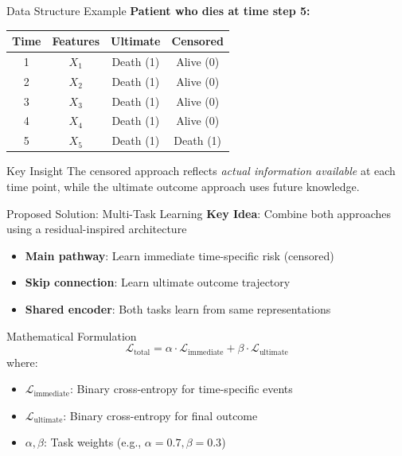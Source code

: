 \documentclass{beamer}
\begin{document}
\begin{frame}{Data Structure Example}
\textbf{Patient who dies at time step 5:}

\begin{table}[h]
\centering
\small
\begin{tabular}{|c|c|c|c|}
\hline
\textbf{Time} & \textbf{Features} & \textbf{Ultimate} & \textbf{Censored} \\
\hline
1 & $X_1$ & Death (1) & Alive (0) \\
2 & $X_2$ & Death (1) & Alive (0) \\
3 & $X_3$ & Death (1) & Alive (0) \\
4 & $X_4$ & Death (1) & Alive (0) \\
5 & $X_5$ & Death (1) & Death (1) \\
\hline
\end{tabular}
\end{table}

\vspace{0.3cm}
\begin{alertblock}{Key Insight}
The censored approach reflects \emph{actual information available} at each time point, while the ultimate outcome approach uses future knowledge.
\end{alertblock}
\end{frame}

\begin{frame}{Proposed Solution: Multi-Task Learning}
\textbf{Key Idea}: Combine both approaches using a residual-inspired architecture

\vspace{0.3cm}
\begin{itemize}
    \item \textbf{Main pathway}: Learn immediate time-specific risk (censored)
    \item \textbf{Skip connection}: Learn ultimate outcome trajectory
    \item \textbf{Shared encoder}: Both tasks learn from same representations
\end{itemize}

\vspace{0.3cm}
\begin{block}{Mathematical Formulation}
\begin{equation*}
\mathcal{L}_{\text{total}} = \alpha \cdot \mathcal{L}_{\text{immediate}} + \beta \cdot \mathcal{L}_{\text{ultimate}}
\end{equation*}
where:
\begin{itemize}
    \item $\mathcal{L}_{\text{immediate}}$: Binary cross-entropy for time-specific events
    \item $\mathcal{L}_{\text{ultimate}}$: Binary cross-entropy for final outcome
    \item $\alpha, \beta$: Task weights (e.g., $\alpha = 0.7, \beta = 0.3$)
\end{itemize}
\end{block}
\end{frame}
\end{document}
